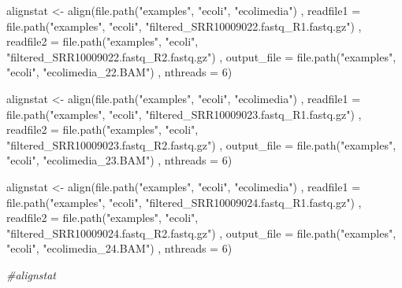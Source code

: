 \documentclass[
]{book}
\newenvironment{Shaded}{\begin{snugshade}}{\end{snugshade}}
\newcommand{\AttributeTok}[1]{\textcolor[rgb]{0.77,0.63,0.00}{#1}}
\newcommand{\CommentTok}[1]{\textcolor[rgb]{0.56,0.35,0.01}{\textit{#1}}}
\newcommand{\DecValTok}[1]{\textcolor[rgb]{0.00,0.00,0.81}{#1}}
\newcommand{\FunctionTok}[1]{\textcolor[rgb]{0.00,0.00,0.00}{#1}}
\newcommand{\NormalTok}[1]{#1}
\newcommand{\OtherTok}[1]{\textcolor[rgb]{0.56,0.35,0.01}{#1}}
\newcommand{\StringTok}[1]{\textcolor[rgb]{0.31,0.60,0.02}{#1}}
\begin{document}
\begin{Shaded}
\begin{Highlighting}[]
\NormalTok{alignstat }\OtherTok{\textless{}{-}} \FunctionTok{align}\NormalTok{(}\FunctionTok{file.path}\NormalTok{(}\StringTok{"examples"}\NormalTok{, }\StringTok{"ecoli"}\NormalTok{, }\StringTok{"ecolimedia"}\NormalTok{)}
\NormalTok{                   , }\AttributeTok{readfile1 =} \FunctionTok{file.path}\NormalTok{(}\StringTok{"examples"}\NormalTok{, }\StringTok{"ecoli"}\NormalTok{, }\StringTok{"filtered\_SRR10009022.fastq\_R1.fastq.gz"}\NormalTok{)}
\NormalTok{                   , }\AttributeTok{readfile2 =} \FunctionTok{file.path}\NormalTok{(}\StringTok{"examples"}\NormalTok{, }\StringTok{"ecoli"}\NormalTok{, }\StringTok{"filtered\_SRR10009022.fastq\_R2.fastq.gz"}\NormalTok{)}
\NormalTok{                   , }\AttributeTok{output\_file =} \FunctionTok{file.path}\NormalTok{(}\StringTok{"examples"}\NormalTok{, }\StringTok{"ecoli"}\NormalTok{, }\StringTok{"ecolimedia\_22.BAM"}\NormalTok{)}
\NormalTok{                   , }\AttributeTok{nthreads =} \DecValTok{6}\NormalTok{)}


\NormalTok{alignstat }\OtherTok{\textless{}{-}} \FunctionTok{align}\NormalTok{(}\FunctionTok{file.path}\NormalTok{(}\StringTok{"examples"}\NormalTok{, }\StringTok{"ecoli"}\NormalTok{, }\StringTok{"ecolimedia"}\NormalTok{)}
\NormalTok{                   , }\AttributeTok{readfile1 =} \FunctionTok{file.path}\NormalTok{(}\StringTok{"examples"}\NormalTok{, }\StringTok{"ecoli"}\NormalTok{, }\StringTok{"filtered\_SRR10009023.fastq\_R1.fastq.gz"}\NormalTok{)}
\NormalTok{                   , }\AttributeTok{readfile2 =} \FunctionTok{file.path}\NormalTok{(}\StringTok{"examples"}\NormalTok{, }\StringTok{"ecoli"}\NormalTok{, }\StringTok{"filtered\_SRR10009023.fastq\_R2.fastq.gz"}\NormalTok{)}
\NormalTok{                   , }\AttributeTok{output\_file =} \FunctionTok{file.path}\NormalTok{(}\StringTok{"examples"}\NormalTok{, }\StringTok{"ecoli"}\NormalTok{, }\StringTok{"ecolimedia\_23.BAM"}\NormalTok{)}
\NormalTok{                   , }\AttributeTok{nthreads =} \DecValTok{6}\NormalTok{)}


\NormalTok{alignstat }\OtherTok{\textless{}{-}} \FunctionTok{align}\NormalTok{(}\FunctionTok{file.path}\NormalTok{(}\StringTok{"examples"}\NormalTok{, }\StringTok{"ecoli"}\NormalTok{, }\StringTok{"ecolimedia"}\NormalTok{)}
\NormalTok{                   , }\AttributeTok{readfile1 =} \FunctionTok{file.path}\NormalTok{(}\StringTok{"examples"}\NormalTok{, }\StringTok{"ecoli"}\NormalTok{, }\StringTok{"filtered\_SRR10009024.fastq\_R1.fastq.gz"}\NormalTok{)}
\NormalTok{                   , }\AttributeTok{readfile2 =} \FunctionTok{file.path}\NormalTok{(}\StringTok{"examples"}\NormalTok{, }\StringTok{"ecoli"}\NormalTok{, }\StringTok{"filtered\_SRR10009024.fastq\_R2.fastq.gz"}\NormalTok{)}
\NormalTok{                   , }\AttributeTok{output\_file =} \FunctionTok{file.path}\NormalTok{(}\StringTok{"examples"}\NormalTok{, }\StringTok{"ecoli"}\NormalTok{, }\StringTok{"ecolimedia\_24.BAM"}\NormalTok{)}
\NormalTok{                   , }\AttributeTok{nthreads =} \DecValTok{6}\NormalTok{)}

\CommentTok{\#alignstat}
\end{Highlighting}
\end{Shaded}
\end{document}
